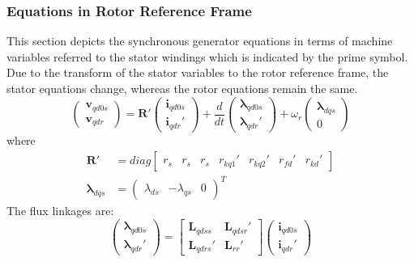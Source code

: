 \subsubsection{Equations in Rotor Reference Frame}

This section depicts the synchronous generator equations in terms of machine variables referred to the stator windings which is indicated by the prime symbol. Due to the transform of the stator variables to the rotor reference frame, the stator equations change, whereas the rotor equations remain the same.
%
\begin{equation}
  \begin{pmatrix}
    \mathbf{v}_{qd0s} \\
    \mathbf{v}_{qdr}
  \end{pmatrix}
  =  
  \mathbf{R}'
  \begin{pmatrix}
    \mathbf{i}_{qd0s} \\
    \mathbf{i}_{qdr}'
  \end{pmatrix}
  +
  \frac{d}{dt}
  \begin{pmatrix}
    \boldsymbol{\lambda}_{qd0s} \\
    \boldsymbol{\lambda}_{qdr}'
  \end{pmatrix}
  + \omega_r
  \begin{pmatrix}
    \boldsymbol{\lambda}_{dqs} \\
    0
  \end{pmatrix}
\end{equation}
%
where
%
\begin{align}
  \mathbf{R}' &= diag
  \begin{bmatrix}
    r_s & r_s & r_s & r_{kq1}' & r_{kq2}' & r_{fd}' & r_{kd}' 
  \end{bmatrix} \\
  \boldsymbol{\lambda}_{dqs} &= 
  \begin{pmatrix}
    \lambda_{ds} & -\lambda_{qs} & 0
  \end{pmatrix}^T
\end{align}
%
The flux linkages are:
%
\begin{equation}
  \begin{pmatrix}
    \boldsymbol{\lambda}_{qd0s} \\
    \boldsymbol{\lambda}_{qdr}'
  \end{pmatrix}
  =
  \begin{bmatrix}
    \mathbf{L}_{qdss} & \mathbf{L}_{qdsr}' \\
    \mathbf{L}_{qdrs}' & \mathbf{L}_{rr}'    
  \end{bmatrix}
  \begin{pmatrix}
    \mathbf{i}_{qd0s} \\
    \mathbf{i}_{qdr}'
  \end{pmatrix}
  \label{eq:flux}
\end{equation}
